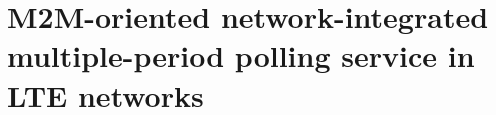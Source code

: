 \chapter{M2M-oriented network-integrated multiple-period polling service in LTE networks}
\label{chapter:vtcfall15}

\ifpdf
    \graphicspath{{Chapter6/Figures/}}
\else
    \graphicspath{{Chapter6/Figures/}}
\fi























